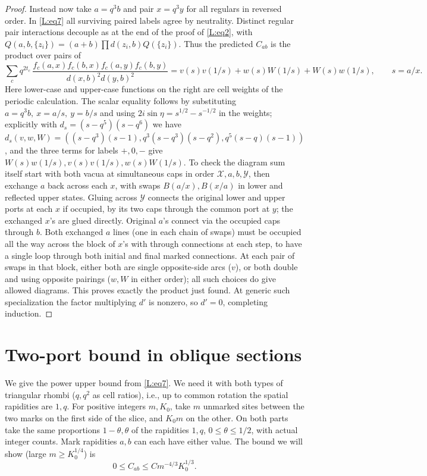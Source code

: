 \documentclass[11pt]{article}
\numberwithin{equation}{section}
\theoremstyle{definition}\newtheorem{definition}[theorem]{Definition}
\theoremstyle{remark}\newtheorem{remark}[theorem]{Remark}
\begin{document}
\begin{proof}
Instead now take \(a=q^3b\) and pair \(x=q^3y\) for all regulars in reversed order. In \eqref{L:eq7} all surviving paired labels agree by neutrality. Distinct regular pair interactions decouple as at the end of the proof of \eqref{L:eq2}, with \(Q(a,b,\{z_i\})=(a+b)\prod d(z_i,b)Q(\{z_i\})\). Thus the predicted \(C_{ab}\) is the product over pairs of
\[
 \sum_c q^{2t_c}\,
 \frac{ f_c(a,x) f_c(b,x) f_c(a,y) f_c(b,y)}
 {d(x,b)^2d(y,b)^2}
 =
 v(s)v(1/s)+w(s)W(1/s)+W(s)w(1/s),\qquad s=a/x .
\]
Here lower-case and upper-case functions on the right are cell weights of the periodic calculation. The scalar equality follows by substituting \(a=q^3 b,\ x=a/s,\ y=b/s\) and using \(2i\sin\eta=s^{1/2}-s^{-1/2}\) in the weights; explicitly with \(d_s=(s-q^5)(s-q^6)\) we have \(d_s(v,w,W)=((s-q^3)(s-1),q^3(s-q^3)(s-q^2),q^5(s-q)(s-1))\), and the three terms for labels \(+,0,-\) give \(W(s)w(1/s), v(s)v(1/s), w(s)W(1/s)\). To check the diagram sum itself start with both vacua at simultaneous caps in order \(\mathcal X,a,b,\mathcal Y\), then exchange \(a\) back across each \(x\), with swaps \(B(a/x),B(x/a)\) in lower and reflected upper states. Gluing across \(\mathcal Y\) connects the original lower and upper ports at each \(x\) if occupied, by its two caps through the common port at \(y\); the exchanged \(x\)'s are glued directly. Original \(a\)'s connect via the occupied caps through \(b\). Both exchanged \(a\) lines (one in each chain of swaps) must be occupied all the way across the block of \(x\)'s with through connections at each step, to have a single loop through both initial and final marked connections. At each pair of swaps in that block, either both are single opposite-side arcs (\(v\)), or both double and using opposite pairings (\(w,W\) in either order); all such choices do give allowed diagrams. This proves exactly the product just found. At generic such specialization the factor multiplying \(d'\) is nonzero, so \(d'=0\), completing induction.
\end{proof}

\section{Two-port bound in oblique sections}\label{L:part9}

We give the power upper bound from \eqref{L:eq7}. We need it with both types of triangular rhombi (\(q,q^2\) as cell ratios), i.e., up to common rotation the spatial rapidities are \(1,q\). For positive integers \(m,K_0\), take \(m\) unmarked sites between the two marks on the first side of the slice, and \(K_0m\) on the other. On both parts take the same proportions \(1-\theta,\theta\) of the rapidities \(1,q\), \(0\le\theta\le1/2\), with actual integer counts. Mark rapidities \(a,b\) can each have either value. The bound we will show (large \(m\ge K_0^{1/4}\)) is
\begin{equation}
 0\le C_{ab}\le C m^{-4/3}K_0^{1/3}.\label{L:eq8}
\end{equation}
\end{document}
